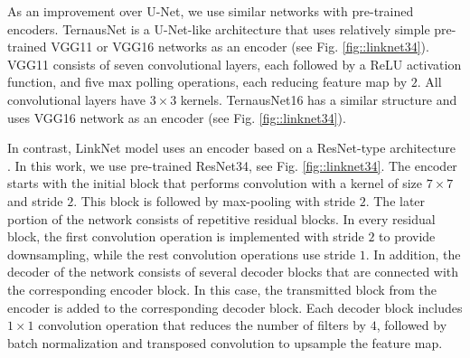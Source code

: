 \documentclass[runningheads,a4paper]{llncs}[2015/06/24]
\begin{document}

As an improvement over U-Net, we use similar networks with pre-trained encoders. TernausNet \cite{iglovikov2018ternausnet} is a U-Net-like architecture that uses relatively simple pre-trained VGG11 or VGG16 \cite{simonyan2014vgg} networks as an encoder (see Fig. \ref{fig::linknet34}). VGG11 consists of seven convolutional layers, each followed by a ReLU activation function, and five max polling operations, each reducing feature map by $2$. All convolutional layers have $3\times3$ kernels. TernausNet16 has a similar structure and uses VGG16 network as an encoder (see Fig. \ref{fig::linknet34}).

In contrast, LinkNet \cite{chaurasia2017linknet} model uses an encoder based on a ResNet-type architecture \cite{he2016resnet}. In this work, we use pre-trained ResNet34, see Fig. \ref{fig::linknet34}. The encoder starts with the initial block that performs convolution with a kernel of size $7\times7$ and stride $2$. This block is followed by max-pooling with stride $2$. The later portion of the network consists of repetitive residual blocks. In every residual block, the first convolution operation is implemented with stride $2$ to provide downsampling, while the rest convolution operations use stride $1$. In addition, the decoder of the network consists of several decoder blocks that are connected with the corresponding encoder block. In this case, the transmitted block from the encoder is added to the corresponding decoder block. Each decoder block includes $1\times1$ convolution operation that reduces the number of filters by $4$, followed by batch normalization and transposed convolution to upsample the feature map.
\end{document}
